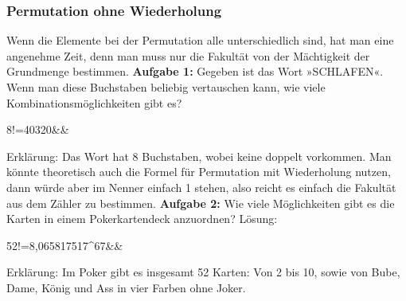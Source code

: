\documentclass[12pt]{article}
\begin{document}
			\subsubsection{Permutation ohne Wiederholung}
				Wenn die Elemente bei der Permutation alle unterschiedlich sind, hat man eine angenehme Zeit, denn man muss nur die Fakultät von der Mächtigkeit der Grundmenge bestimmen.\newline\newline
				\textbf{Aufgabe 1:} Gegeben ist das Wort »SCHLAFEN«. Wenn man diese Buchstaben beliebig vertauschen kann, wie viele Kombinationsmöglichkeiten gibt es?
				\begin{flalign*}
				8!=40320&&
				\end{flalign*}
				Erklärung: Das Wort hat 8 Buchstaben, wobei keine doppelt vorkommen. Man könnte theoretisch auch die Formel für Permutation mit Wiederholung nutzen, dann würde aber im Nenner einfach 1 stehen, also reicht es einfach die Fakultät aus dem Zähler zu bestimmen.\newline\newline
				\textbf{Aufgabe 2:} Wie viele Möglichkeiten gibt es die Karten in einem Pokerkartendeck anzuordnen?\newline\newline
				Lösung:
				\begin{flalign*}
				52!=8,065817517^{67}&&
				\end{flalign*}
				Erklärung: Im Poker gibt es insgesamt 52 Karten: Von 2 bis 10, sowie von Bube, Dame, König und Ass in vier Farben ohne Joker.
\end{document}
